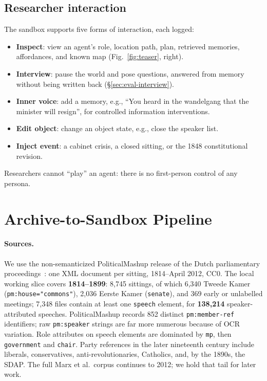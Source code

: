 \documentclass[sigconf,review,anonymous]{acmart}
\begin{document}
\subsection{Researcher interaction}

The sandbox supports five forms of interaction, each logged:
\begin{itemize}[leftmargin=*,nosep]
\item \textbf{Inspect}: view an agent's role, location path, plan,
retrieved memories, affordances, and known map (Fig.~\ref{fig:teaser}, right).
\item \textbf{Interview}: pause the world and pose questions, answered from
memory without being written back (\S\ref{sec:eval-interview}).
\item \textbf{Inner voice}: add a memory, e.g., ``You heard in the wandelgang
that the minister will resign'', for controlled information interventions.
\item \textbf{Edit object}: change an object state, e.g., close the speaker list.
\item \textbf{Inject event}: a cabinet crisis, a closed sitting, or the 1848
constitutional revision.
\end{itemize}
Researchers cannot ``play'' an agent: there is no first-person control of
any persona.

\section{Archive-to-Sandbox Pipeline}
\label{sec:pipeline}

\paragraph{Sources.} We use the non-semanticized PoliticalMashup release of
the Dutch parliamentary proceedings~\cite{marx2012dutchparl}: one XML
document per sitting, 1814--April 2012, CC0. The local working slice covers
\textbf{1814--1899}: 8{,}745 sittings, of which 6{,}340 Tweede Kamer
(\texttt{pm:house="commons"}), 2{,}036 Eerste Kamer (\texttt{senate}), and
369 early or unlabelled meetings; 7{,}348 files contain at least one
\texttt{speech} element, for \textbf{138{,}214} speaker-attributed
speeches. PoliticalMashup records 852 distinct \texttt{pm:member-ref}
identifiers; raw \texttt{pm:speaker} strings are far more numerous because
of OCR variation. Role attributes on speech elements are dominated by
\texttt{mp}, then \texttt{government} and \texttt{chair}. Party references
in the later nineteenth century include liberals, conservatives,
anti-revolutionaries, Catholics, and, by the 1890s, the SDAP. The full
Marx et al.\ corpus continues to 2012; we hold that tail for later work.
\end{document}
